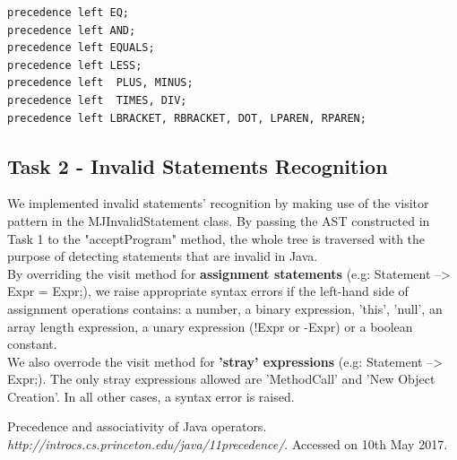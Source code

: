 \documentclass[paper=a4, fontsize=11pt]{scrartcl}
\numberwithin{equation}{section}		%
\numberwithin{figure}{section}			%
\numberwithin{table}{section}				%
\begin{document}
\begin{lstlisting}
precedence left EQ;
precedence left AND;
precedence left EQUALS;
precedence left LESS;
precedence left  PLUS, MINUS;
precedence left  TIMES, DIV;
precedence left LBRACKET, RBRACKET, DOT, LPAREN, RPAREN;
\end{lstlisting}


\subsection*{Task 2 - Invalid Statements Recognition}

We implemented invalid statements' recognition by making use of the visitor pattern in the MJInvalidStatement class. By passing the AST constructed in Task 1 to  the "acceptProgram" method, the whole tree is traversed with the purpose of detecting statements that are invalid in Java.\\
By overriding the visit method for \textbf{assignment statements} (e.g: Statement --> Expr = Expr;), we raise appropriate syntax errors if the left-hand side of assignment operations contains: a number, a binary expression, 'this', 'null', an array length expression, a unary expression (!Expr or -Expr) or a boolean constant.\\
We also overrode the visit method for \textbf{'stray' expressions} (e.g: Statement --> Expr;). The only stray expressions allowed are 'MethodCall' and 'New Object Creation'. In all other cases, a syntax error is raised. 






\begin{thebibliography}{9}%
Precedence and associativity of Java operators. \textit{http://introcs.cs.princeton.edu/java/11precedence/}. Accessed on 10th May 2017.
\end{thebibliography}
\end{document}
